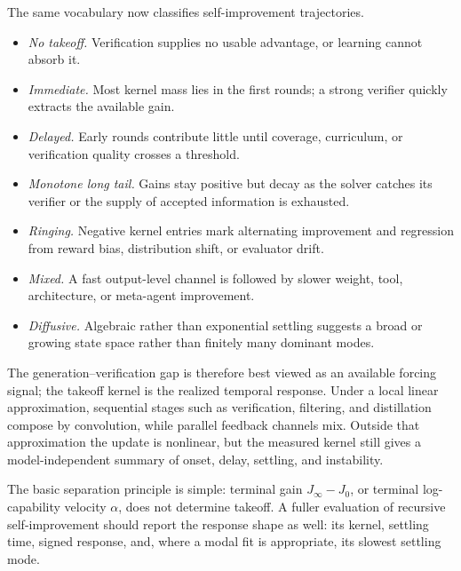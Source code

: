 \documentclass[10pt,twocolumn]{article}
\begin{document}
The same vocabulary now classifies self-improvement trajectories.
\begin{itemize}
\item \emph{No takeoff.} Verification supplies no usable advantage, or learning
cannot absorb it.
\item \emph{Immediate.} Most kernel mass lies in the first rounds; a strong verifier
quickly extracts the available gain.
\item \emph{Delayed.} Early rounds contribute little until coverage, curriculum, or
verification quality crosses a threshold.
\item \emph{Monotone long tail.} Gains stay positive but decay as the solver catches
its verifier or the supply of accepted information is exhausted.
\item \emph{Ringing.} Negative kernel entries mark alternating improvement and
regression from reward bias, distribution shift, or evaluator drift.
\item \emph{Mixed.} A fast output-level channel is followed by slower weight, tool,
architecture, or meta-agent improvement.
\item \emph{Diffusive.} Algebraic rather than exponential settling suggests a broad
or growing state space rather than finitely many dominant modes.
\end{itemize}

The generation--verification gap is therefore best viewed as an available
forcing signal; the takeoff kernel is the realized temporal response.  Under a
local linear approximation, sequential stages such as verification, filtering,
and distillation compose by convolution, while parallel feedback channels mix.
Outside that approximation the update is nonlinear, but the measured kernel
still gives a model-independent summary of onset, delay, settling, and
instability.

The basic separation principle is simple: terminal gain $J_\infty-J_0$, or
terminal log-capability velocity $\alpha$, does not determine takeoff.  A fuller
evaluation of recursive self-improvement should report the response shape as
well: its kernel, settling time, signed response, and, where a modal fit is
appropriate, its slowest settling mode.
\end{document}
